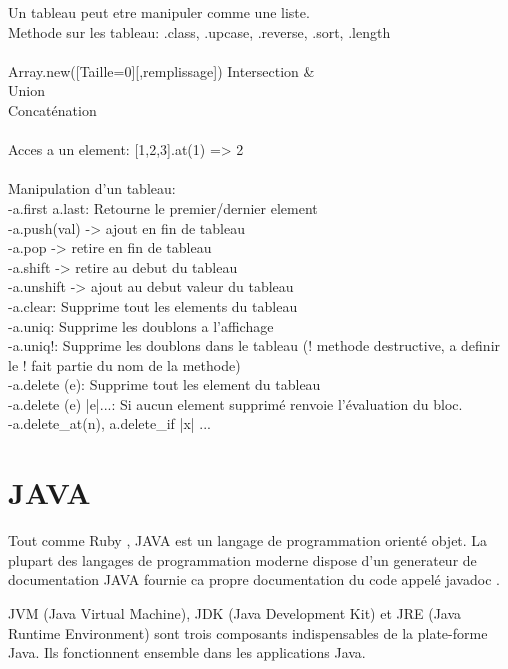 \documentclass[a4paper,12pt,openany]{book}
\begin{document}
Un tableau peut etre manipuler comme une liste.\\
Methode sur les tableau: .class, .upcase, .reverse, .sort, .length\\
\\
Array.new([Taille=0][,remplissage])
Intersection \& \\
Union \| \\
Concaténation \* \\
\\
Acces a un element: [1,2,3].at(1) => 2\\
\\
Manipulation d'un tableau: \\
-a.first a.last: Retourne le premier/dernier element \\
-a.push(val) -> ajout en fin de tableau\\
-a.pop -> retire en fin de tableau\\
-a.shift -> retire au debut du tableau \\
-a.unshift -> ajout au debut valeur du tableau \\
-a.clear: Supprime tout les elements du tableau\\
-a.uniq: Supprime les doublons a l'affichage\\
-a.uniq!: Supprime les doublons dans le tableau (! methode destructive, a definir le ! fait partie du nom de la methode)\\
-a.delete (e): Supprime tout les element du tableau \\
-a.delete (e) {|e|...}: Si aucun element supprimé renvoie l'évaluation du bloc.\\
-a.delete_at(n), a.delete_if {|x| ... } \\




\chapter{JAVA}

Tout comme Ruby , JAVA est un langage de programmation orienté objet. La plupart des langages de programmation moderne dispose d'un generateur de documentation JAVA fournie ca propre documentation du code appelé javadoc .

JVM (Java Virtual Machine), JDK (Java Development Kit) et JRE (Java Runtime Environment) sont trois composants indispensables de la plate-forme Java. Ils fonctionnent ensemble dans les applications Java.
\end{document}
